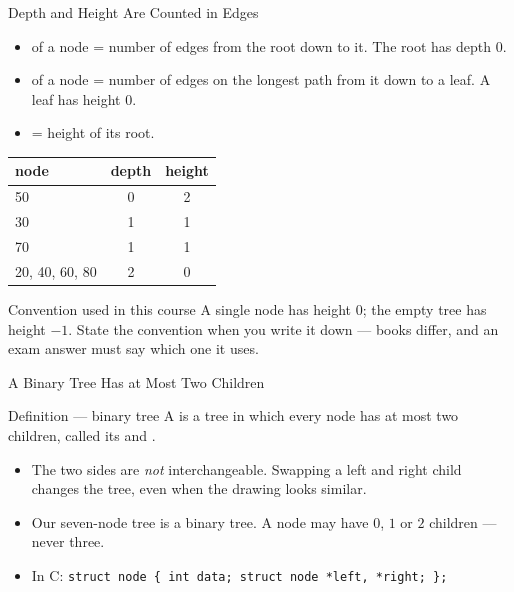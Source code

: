 \documentclass[aspectratio=169]{beamer}
\begin{document}
\begin{frame}{Depth and Height Are Counted in Edges}
  \vspace{-0.15cm}
  \begin{itemize}
    \item {} of a node = number of edges from the root down to it.
      The root has depth $0$.
    \item {} of a node = number of edges on the longest path from
      it down to a leaf. A leaf has height $0$.
    \item {} = height of its root.
  \end{itemize}
  \begin{center}
  {\footnotesize
  \begin{tabular}{l c c}
    \toprule
    \textbf{node} & \textbf{depth} & \textbf{height} \\
    \midrule
    50 & 0 & 2 \\
    30 & 1 & 1 \\
    70 & 1 & 1 \\
    20, 40, 60, 80 & 2 & 0 \\
    \bottomrule
  \end{tabular}}
  \end{center}
  \begin{exampleblock}{Convention used in this course}
    A single node has height $0$; the empty tree has height $-1$. State the
    convention when you write it down --- books differ, and an exam answer
    must say which one it uses.
  \end{exampleblock}
\end{frame}

\begin{frame}{A Binary Tree Has at Most Two Children}
  \begin{block}{Definition --- binary tree}
    A  is a tree in which every node has at most two
    children, called its  and .
  \end{block}
  \begin{itemize}
    \item The two sides are \emph{not} interchangeable. Swapping a left and
      right child changes the tree, even when the drawing looks similar.
    \item Our seven-node tree is a binary tree. A node may have $0$, $1$ or
      $2$ children --- never three.
    \item In C:
      \texttt{struct node \{ int data; struct node *left, *right; \};}
  \end{itemize}
\end{frame}
\end{document}
